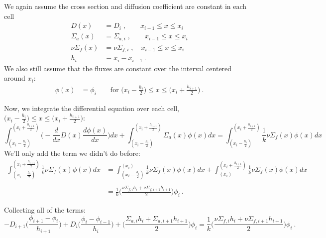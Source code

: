 \documentclass[12pt]{article}
\begin{document}
We again assume the cross section and diffusion coefficient are constant in each cell 
\begin{align}
D(x) &= D_i\;, \qquad x_{i-1} \leq x \leq x_i \nonumber \\
\Sigma_a(x) &= \Sigma_{a,i}\;, \qquad x_{i-1} \leq x \leq x_i \nonumber \\
\nu\Sigma_f(x) &= \nu\Sigma_{f,i}\;, \quad x_{i-1} \leq x \leq x_i \nonumber \\
h_i &\equiv x_{i} - x_{i-1} \:.\nonumber 
\end{align}
%
We also still assume that the fluxes are constant over the interval centered around $x_i$:
%
\begin{align}
\phi(x) &= \phi_i \qquad \text{for } \bigl(x_i - \frac{h_i}{2}\bigr) \leq x \leq \bigl(x_i + \frac{h_{i+1}}{2}\bigr)\:. \nonumber %
\end{align}

Now, we integrate the differential equation over each cell, $\bigl(x_i - \frac{h_i}{2}\bigr) \leq x \leq \bigl(x_i + \frac{h_{i+1}}{2}\bigr)$:
%
\[\int_{(x_i - \frac{h_i}{2})}^{(x_i + \frac{h_{i+1}}{2})} \biggl(  -\frac{d}{dx}D(x)\frac{d \phi(x)}{dx}\biggr) dx 
+ \int_{(x_i - \frac{h_i}{2})}^{(x_i + \frac{h_{i+1}}{2})} \Sigma_a(x) \phi(x) dx 
= \int_{(x_i - \frac{h_i}{2})}^{(x_i + \frac{h_{i+1}}{2})} \frac{1}{k}\nu \Sigma_f(x) \phi(x) dx\]
%
We'll only add the term we didn't do before:
%
\begin{align}
\int_{(x_i - \frac{h_i}{2})}^{(x_i + \frac{h_{i+1}}{2})} \frac{1}{k}\nu \Sigma_f(x)\phi(x) dx &= 
%
\int_{(x_i - \frac{h_i}{2})}^{(x_i)} \frac{1}{k}\nu \Sigma_f(x) \phi(x) dx + \int_{(x_i)}^{(x_i + \frac{h_{i+1}}{2})} \frac{1}{k}\nu \Sigma_f(x) \phi(x) dx \nonumber\\
%
&\nonumber \\
&= \frac{1}{k} \biggl(\frac{\nu\Sigma_{f,i}h_i + \nu\Sigma_{f,i+1}h_{i+1}}{2} \biggr)\phi_i \:.\nonumber 
\end{align}

Collecting all of the terms:
%
\begin{equation}
-D_{i+1}\biggl(\frac{\phi_{i+1} - \phi_i}{h_{i+1}}\biggr) + D_{i}\biggl(\frac{\phi_{i} - \phi_{i-1}}{h_{i}}\biggr) + \biggl(\frac{\Sigma_{a,i}h_i + \Sigma_{a,i+1}h_{i+1}}{2} \biggr)\phi_i =   \frac{1}{k} \biggl(\frac{\nu\Sigma_{f,i}h_i + \nu\Sigma_{f,i+1}h_{i+1}}{2} \biggr)\phi_i \:.\nonumber
\end{equation}
\end{document}
